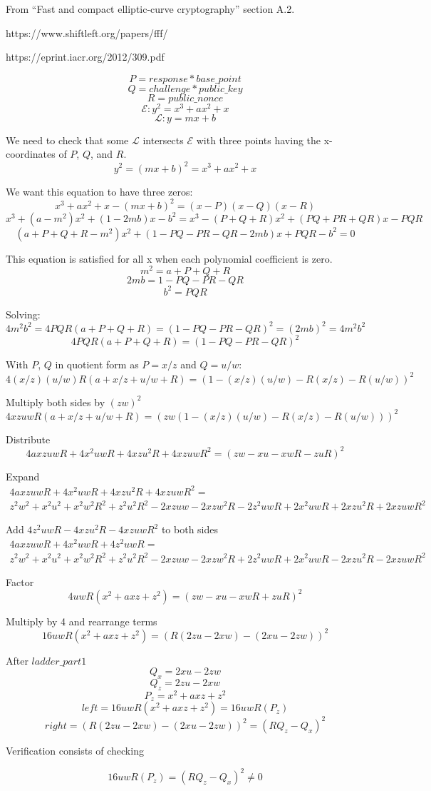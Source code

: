 \documentclass[fleqn]{amsart}
\begin{document}
\setlength{\parindent}{0pt}
\setlength{\mathindent}{0pt}

From ``Fast and compact elliptic-curve cryptography'' section A.2.

https://www.shiftleft.org/papers/fff/

https://eprint.iacr.org/2012/309.pdf

$$P = response*base\_point$$
$$Q = challenge*public\_key$$
$$R = public\_nonce$$
$$\mathcal{E}: y^2 = x^3 + ax^2 + x$$
$$\mathcal{L}: y = mx + b$$

We need to check that some $\mathcal{L}$ intersects $\mathcal{E}$ with three points having the x-coordinates of $P$, $Q$, and $R$.
$$y^2 = (mx + b)^2 = x^3 + ax^2 + x$$

We want this equation to have three zeros:
$$x^3 + ax^2 + x - (mx + b)^2 = (x - P)(x - Q)(x - R)$$
$$x^3 + (a - m^2)x^2 + (1 - 2mb)x - b^2 =
x^3 - (P + Q + R)x^2 + (PQ + PR + QR)x - PQR$$
$$(a + P + Q + R - m^2)x^2 + (1 - PQ - PR - QR - 2mb)x + PQR - b^2 = 0$$

This equation is satisfied for all x when each polynomial
coefficient is zero.
$$m^2 = a + P + Q + R$$
$$2mb = 1 - PQ - PR - QR$$
$$b^2 = PQR$$

Solving:
$$4m^2b^2 = 4PQR(a + P + Q + R) = (1 - PQ - PR - QR)^2 = (2mb)^2 = 4m^2b^2$$
$$4PQR(a + P + Q + R) = (1 - PQ - PR - QR)^2$$

With $P$, $Q$ in quotient form as $P = x/z$ and $Q = u/w$:
$$4(x/z)(u/w)R(a + x/z + u/w + R) = (1 - (x/z)(u/w) - R(x/z) - R(u/w))^2$$

Multiply both sides by $(zw)^2$
$$4xzuwR(a + x/z + u/w + R) = (zw(1 - (x/z)(u/w) - R(x/z) - R(u/w)))^2$$

Distribute
$$4axzuwR + 4x^2uwR + 4xzu^2R + 4xzuwR^2 = (zw - xu - xwR - zuR)^2$$

Expand
\begin{multline*}
4axzuwR + 4x^2uwR + 4xzu^2R + 4xzuwR^2 = \\
z^2w^2 + x^2u^2 + x^2w^2R^2 + z^2u^2R^2 - 2xzuw - 2xzw^2R - 2z^2uwR + 2x^2uwR + 2xzu^2R + 2xzuwR^2
\end{multline*}

Add $4z^2uwR - 4xzu^2R - 4xzuwR^2$ to both sides
\begin{multline*}
4axzuwR + 4x^2uwR + 4z^2uwR = \\
z^2w^2 + x^2u^2 + x^2w^2R^2 + z^2u^2R^2 - 2xzuw - 2xzw^2R + 2z^2uwR + 2x^2uwR - 2xzu^2R - 2xzuwR^2
\end{multline*}

Factor
$$4uwR(x^2 + axz + z^2) = (zw - xu - xwR + zuR)^2$$

Multiply by 4 and rearrange terms
$$16uwR(x^2 + axz + z^2) = (R(2zu - 2xw) - (2xu - 2zw))^2$$

After $ladder\_part1$
$$Q_x = 2xu - 2zw$$
$$Q_z = 2zu - 2xw$$
$$P_z = x^2 + axz + z^2$$
$$left = 16uwR(x^2 + axz + z^2) = 16uwR(P_z)$$
$$right = (R(2zu - 2xw) - (2xu - 2zw))^2 = (RQ_z - Q_x)^2$$

Verification consists of checking

$$16uwR(P_z) = (RQ_z - Q_x)^2 \neq 0$$
\end{document}
